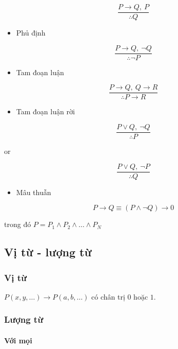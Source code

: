 \documentclass[11pt]{article}
\providecommand{\tightlist}{%
      \setlength{\itemsep}{0pt}\setlength{\parskip}{0pt}}
\begin{document}
\[
\frac{P \to Q, \: P}{\therefore Q}
\]

\begin{itemize}
\tightlist
\item
  Phủ định
\end{itemize}

\[
\frac{P \to Q, \: \neg Q}{\therefore \neg P}
\]

\begin{itemize}
\tightlist
\item
  Tam đoạn luận
\end{itemize}

\[
\frac{P \to Q, \: Q \to R}{\therefore P \to R}
\]

\begin{itemize}
\tightlist
\item
  Tam đoạn luận rời
\end{itemize}

\[
\frac{P \lor Q, \: \neg Q}{\therefore P}
\]

or

\[
\frac{P \lor Q, \: \neg P}{\therefore Q}
\]

\begin{itemize}
\tightlist
\item
  Mâu thuẫn
\end{itemize}

\[
P \to Q \equiv (P \land \neg Q) \to 0
\]

trong đó \(P = P_1 \land P_2 \land \ldots \land P_N\)

    \subsection{Vị từ - lượng
từ}\label{vux1ecb-tux1eeb---lux1b0ux1ee3ng-tux1eeb}

    \subsubsection{Vị từ}\label{vux1ecb-tux1eeb}

    \(P(x,y,\ldots) \to P(a,b,\ldots)\) có chân trị \(0\) hoặc \(1\).

    \subsubsection{Lượng từ}\label{lux1b0ux1ee3ng-tux1eeb}

    \paragraph{Với mọi}\label{vux1edbi-mux1ecdi}
\end{document}
